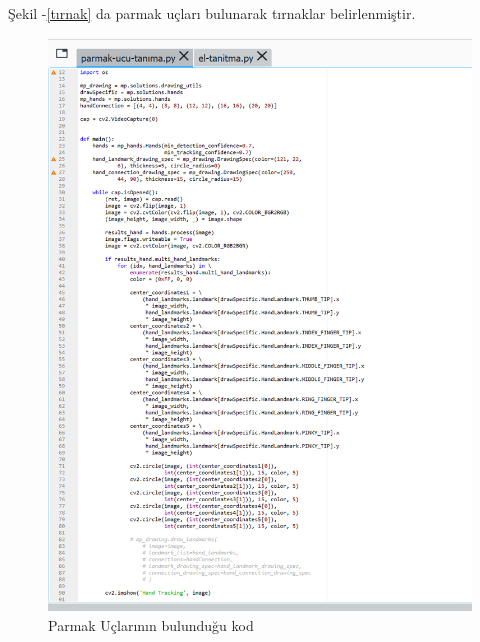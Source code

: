 \documentclass[11pt,a4paper]{report}
\begin{document}
	Şekil -\ref{tırnak} da parmak uçları bulunarak tırnaklar belirlenmiştir.
	\begin{figure}[!h]
		\centering
		\includegraphics[width=\textwidth]{tırnak-kod2}
		\caption{Parmak Uçlarının bulunduğu kod}
	\end{figure}
	
\end{document}
